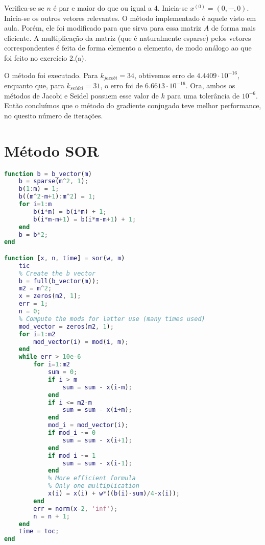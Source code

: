 \documentclass{article}
\begin{document}
\begin{enumerate}
\begin{enumerate}
                    Verifica-se se $n$ é par e maior do que ou igual a 4.
                    Inicia-se $x^{(0)} = (0, \cdots, 0)$. Inicia-se os outros vetores
                    relevantes. O método implementado é aquele visto em aula.
                    Porém, ele foi modificado para que sirva para essa matriz $A$ de forma mais eficiente.
                    A multiplicação da matriz (que é naturalmente esparse) pelos vetores correspondentes é 
                    feita de forma elemento a elemento, de modo análogo ao que foi feito
                    no exercício 2.(a).

                    O método foi executado. Para $k_{jacobi} = 34$, obtivemos erro de $4.4409\cdot 10^{-16}$,
                    enquanto que, para $k_{seidel} = 31$, o erro foi de $6.6613\cdot 10^{-16}$. Ora, ambos os métodos
                    de Jacobi e Seidel possuem esse valor de $k$ para uma tolerância de $10^{-6}$. Então concluímos que
                    o método do gradiente conjugado teve melhor performance, no quesito número
                    de iterações.
            \end{enumerate}

    \end{enumerate}

    \appendix

    \section{Método SOR}
        \label{appendix:a}

        \begin{lstlisting}[language=Matlab]
function b = b_vector(m)
    b = sparse(m^2, 1);
    b(1:m) = 1;
    b((m^2-m+1):m^2) = 1;
    for i=1:m
        b(i*m) = b(i*m) + 1;
        b(i*m-m+1) = b(i*m-m+1) + 1;
    end
    b = b*2;
end        

function [x, n, time] = sor(w, m)
    tic
    % Create the b vector
    b = full(b_vector(m));
    m2 = m^2;
    x = zeros(m2, 1);
    err = 1;
    n = 0;
    % Compute the mods for latter use (many times used)
    mod_vector = zeros(m2, 1);
    for i=1:m2
        mod_vector(i) = mod(i, m);
    end
    while err > 10e-6
        for i=1:m2
            sum = 0;
            if i > m
                sum = sum - x(i-m);
            end
            if i <= m2-m
                sum = sum - x(i+m);
            end
            mod_i = mod_vector(i);
            if mod_i ~= 0
                sum = sum - x(i+1);
            end
            if mod_i ~= 1
                sum = sum - x(i-1);
            end
            % More efficient formula
            % Only one multiplication
            x(i) = x(i) + w*((b(i)-sum)/4-x(i));
        end
        err = norm(x-2, 'inf');
        n = n + 1;
    end
    time = toc;
end

        \end{lstlisting}
\end{document}
